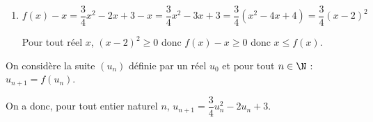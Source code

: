 \begin{enumerate}
On a donc : $\dfrac43 \leqslant x \leqslant 2 \Longrightarrow f\left(\dfrac43\right) \leqslant f(x) \leqslant f(2)$.

Or $f\left(\dfrac43\right) = \dfrac53$ et $f(2) = \dfrac34 \times 4 - 2 \times 2 + 3 = 3 - 4 + 3 = 2$.

Donc $\dfrac53 \leqslant f(x) \leqslant  2$ et \emph{a fortiori} : $\dfrac43 \leqslant f(x) \leqslant 2$.

\item%
%

$f(x)-x = \dfrac{3}{4} x^2 -2x+3-x = \dfrac{3}{4}x^2 - 3x +3 = \dfrac{3}{4}\left ( x^2 -4x+4 \right ) = \dfrac{3}{4} \left (x-2\right )^2$ 

Pour tout réel $x$, $(x-2)^2\geqslant 0$ donc $f(x)-x \geqslant 0$ donc $x\leqslant f(x)$.
\end{enumerate}

On considère la suite $\left(u_n\right)$ définie par un réel $u_0$ et pour tout  $n\in\N$ : $u_{n+1} = f\left(u_n\right).$

On a donc, pour tout entier naturel $n$,
$u_{n+1} = \dfrac34 u_n^2 - 2u_n + 3.$


